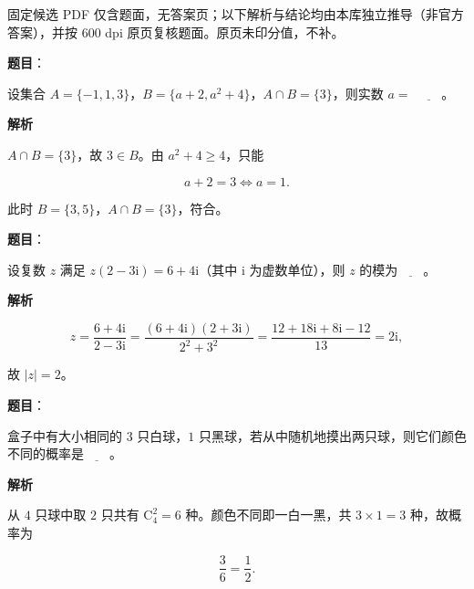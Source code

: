 
\begin{gktip}
固定候选 PDF 仅含题面，无答案页；以下解析与结论均由本库独立推导（非官方答案），并按 600 dpi 原页复核题面。原页未印分值，不补。
\end{gktip}

\begin{answer}

\textbf{题目}：

设集合 $A=\{-1,1,3\}$，$B=\{a+2,a^2+4\}$，$A\cap B=\{3\}$，则实数 $a=$ $\underline{\qquad}$。

\textbf{解析}

$A\cap B=\{3\}$，故 $3\in B$。由 $a^2+4\geqslant4$，只能

\nopagebreak[4]
\[a+2=3\iff a=1.\]

此时 $B=\{3,5\}$，$A\cap B=\{3\}$，符合。


\end{answer}
\begin{answer}

\textbf{题目}：

设复数 $z$ 满足 $z(2-3\mathrm i)=6+4\mathrm i$（其中 $\mathrm i$ 为虚数单位），则 $z$ 的模为$\underline{\qquad}$。

\textbf{解析}

\nopagebreak[4]
\[z=\frac{6+4\mathrm i}{2-3\mathrm i}
=\frac{(6+4\mathrm i)(2+3\mathrm i)}{2^2+3^2}
=\frac{12+18\mathrm i+8\mathrm i-12}{13}
=2\mathrm i,\]

故 $|z|=2$。


\end{answer}
\begin{answer}

\textbf{题目}：

盒子中有大小相同的 $3$ 只白球，$1$ 只黑球，若从中随机地摸出两只球，则它们颜色不同的概率是$\underline{\qquad}$。

\textbf{解析}

从 $4$ 只球中取 $2$ 只共有 $\mathrm C_4^2=6$ 种。颜色不同即一白一黑，共 $3\times1=3$ 种，故概率为

\nopagebreak[4]
\[\frac36=\frac12.\]


\end{answer}
